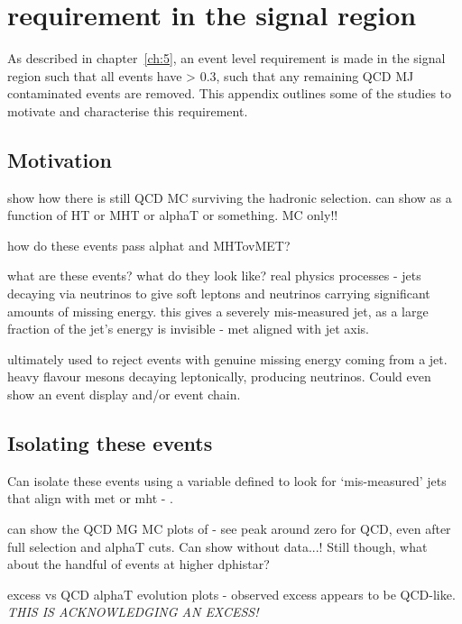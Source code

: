 \label{ch:app_dphistar}


\chapter{\mindphistar requirement in the signal region}

As described in chapter~\ref{ch:5}, an event level requirement is made in the
signal region such that all events have \mindphistar > 0.3, such that any
remaining QCD MJ contaminated events are removed. This appendix outlines some of
the studies to motivate and characterise this requirement.

\section{Motivation}

show how there is still QCD MC surviving the hadronic selection. can show as a
function of HT or MHT or alphaT or something. MC only!!

how do these events pass alphat and MHTovMET?

what are these events? what do they look like? real physics processes - jets
decaying via neutrinos to give soft leptons and neutrinos carrying significant
amounts of missing energy. this gives a severely mis-measured jet, as a
large fraction of the jet's energy is invisible - met aligned with jet axis.

ultimately used to reject events with genuine missing energy coming from a jet.
heavy flavour mesons decaying leptonically, producing neutrinos. Could even show
an event display and/or event chain.

\section{Isolating these events}

Can isolate these events using a variable defined to look for `mis-measured'
jets that align with met or mht - \mindphistar.

can show the QCD MG MC plots of \dphistar - see peak around zero for QCD, even
after full selection and alphaT cuts. Can show without data...! Still though,
what about the handful of events at higher dphistar?

excess vs QCD alphaT evolution plots - observed excess appears to be QCD-like.
\emph{THIS IS ACKNOWLEDGING AN EXCESS!}

